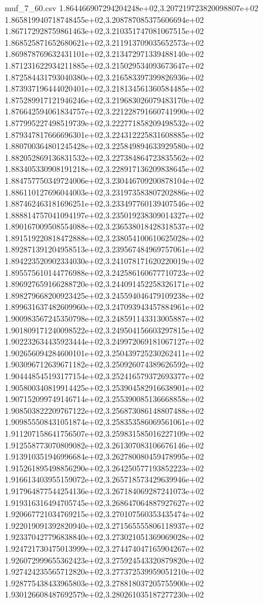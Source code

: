 \begin{filecontents*}{muf_7_60.csv}
1.864466907294204248e+02,3.207219723820098807e+02
1.865819940718748455e+02,3.208787085375606694e+02
1.867172928759861463e+02,3.210351747081067515e+02
1.868525871652680621e+02,3.211913709035652573e+02
1.869878769632431101e+02,3.213472971339488140e+02
1.871231622934211885e+02,3.215029534093673647e+02
1.872584431793040380e+02,3.216583397399826936e+02
1.873937196444020401e+02,3.218134561360584485e+02
1.875289917121946246e+02,3.219683026079483170e+02
1.876642594061834757e+02,3.221228791660741990e+02
1.877995227498519739e+02,3.222771858209498532e+02
1.879347817666696301e+02,3.224312225831608885e+02
1.880700364801245428e+02,3.225849894633929580e+02
1.882052869136831532e+02,3.227384864723835562e+02
1.883405330908191218e+02,3.228917136209838645e+02
1.884757750349724006e+02,3.230446709200878104e+02
1.886110127696044003e+02,3.231973583807202886e+02
1.887462463181696251e+02,3.233497760139407546e+02
1.888814757041094197e+02,3.235019238309014327e+02
1.890167009508554088e+02,3.236538018428318537e+02
1.891519220818472888e+02,3.238054100610625028e+02
1.892871391204958513e+02,3.239567484969757061e+02
1.894223520902334030e+02,3.241078171620220019e+02
1.895575610144776988e+02,3.242586160677710723e+02
1.896927659166288720e+02,3.244091452258326171e+02
1.898279668200923425e+02,3.245594046479109238e+02
1.899631637482609960e+02,3.247093943457884961e+02
1.900983567245350798e+02,3.248591143313005887e+02
1.901809171240098522e+02,3.249504156603297815e+02
1.902232634435923444e+02,3.249972069181067127e+02
1.902656094284600101e+02,3.250439725230262411e+02
1.903096712639671182e+02,3.250926074389626592e+02
1.904448545193177154e+02,3.252416579372693377e+02
1.905800340819914425e+02,3.253904582916638901e+02
1.907152099749146714e+02,3.255390085136668858e+02
1.908503822209767122e+02,3.256873086148807488e+02
1.909855508431051874e+02,3.258353586069561061e+02
1.911207158641756507e+02,3.259831585016227109e+02
1.912558773070809082e+02,3.261307083106676146e+02
1.913910351946996684e+02,3.262780080459478995e+02
1.915261895498856290e+02,3.264250577193852223e+02
1.916613403955159072e+02,3.265718573429639946e+02
1.917964877544254136e+02,3.267184069287241073e+02
1.919316316494705745e+02,3.268647064887927627e+02
1.920667721034769215e+02,3.270107560353435474e+02
1.922019091392820940e+02,3.271565555806118937e+02
1.923370427796838840e+02,3.273021051369069028e+02
1.924721730475013999e+02,3.274474047165904267e+02
1.926072999655362423e+02,3.275924543320879820e+02
1.927424235565712820e+02,3.277372539959051210e+02
1.928775438433965803e+02,3.278818037205755900e+02
1.930126608487692579e+02,3.280261035187277230e+02

\end{filecontents*}
